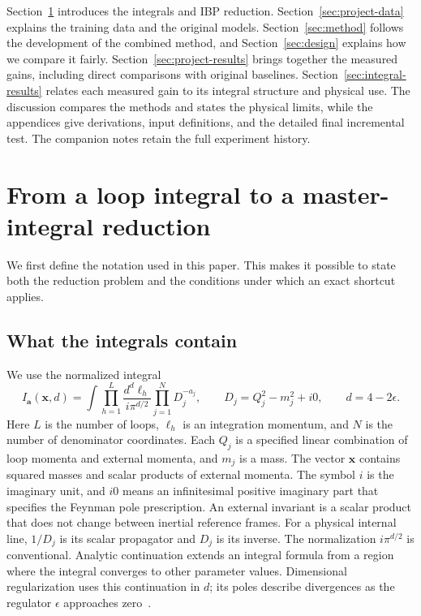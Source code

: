 Section~\ref{sec:physics} introduces the integrals and IBP reduction. Section~\ref{sec:project-data} explains the training data and the original models. Section~\ref{sec:method} follows the development of the combined method, and Section~\ref{sec:design} explains how we compare it fairly. Section~\ref{sec:project-results} brings together the measured gains, including direct comparisons with original baselines. Section~\ref{sec:integral-results} relates each measured gain to its integral structure and physical use. The discussion compares the methods and states the physical limits, while the appendices give derivations, input definitions, and the detailed final incremental test. The companion notes retain the full experiment history.

\section{From a loop integral to a master-integral reduction}
\label{sec:physics}
We first define the notation used in this paper. This makes it possible to state both the reduction problem and the conditions under which an exact shortcut applies.

\subsection{What the integrals contain}
We use the normalized integral
\begin{equation}
 I_{\boldsymbol a}(\boldsymbol x,d)=
 \int\prod_{h=1}^{L}\frac{d^d\ell_h}{i\pi^{d/2}}
 \prod_{j=1}^{N}D_j^{-a_j},
 \qquad D_j=Q_j^2-m_j^2+i0,\qquad d=4-2\epsilon.
 \label{eq:integral}
\end{equation}
Here $L$ is the number of loops, $\ell_h$ is an integration momentum, and $N$ is the number of denominator coordinates. Each $Q_j$ is a specified linear combination of loop momenta and external momenta, and $m_j$ is a mass. The vector $\boldsymbol x$ contains squared masses and scalar products of external momenta. The symbol $i$ is the imaginary unit, and $i0$ means an infinitesimal positive imaginary part that specifies the Feynman pole prescription. An external invariant is a scalar product that does not change between inertial reference frames. For a physical internal line, $1/D_j$ is its scalar propagator and $D_j$ is its inverse. The normalization $i\pi^{d/2}$ is conventional. Analytic continuation extends an integral formula from a region where the integral converges to other parameter values. Dimensional regularization uses this continuation in $d$; its poles describe divergences as the regulator $\epsilon$ approaches zero~\cite{Weinzierl2022}.

